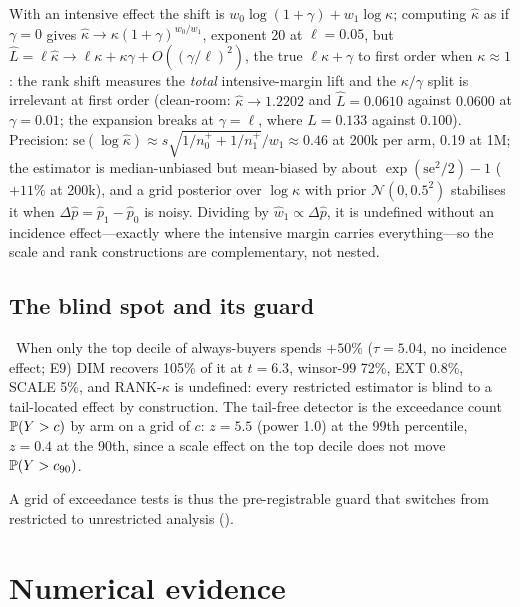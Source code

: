 With an intensive effect the shift is $w_0\log(1 + \gamma) + w_1\log\kappa$; computing $\hat\kappa$ as if $\gamma = 0$ gives $\hat\kappa \to \kappa(1 + \gamma)^{w_0/w_1}$, exponent 20 at $\ell = 0.05$, but $\hat L = \ell\hat\kappa \to \ell\kappa + \kappa\gamma + O((\gamma/\ell)^2)$, the true $\ell\kappa + \gamma$ to first order when $\kappa \approx 1$: the rank shift measures the \emph{total} intensive-margin lift and the $\kappa/\gamma$ split is irrelevant at first order (clean-room: $\hat\kappa \to 1.2202$ and $\hat L = 0.0610$ against $0.0600$ at $\gamma = 0.01$; the expansion breaks at $\gamma = \ell$, where $\hat L = 0.133$ against $0.100$). Precision: $\mathrm{se}(\log\hat\kappa) \approx s\sqrt{1/n_0^+ + 1/n_1^+}/w_1 \approx 0.46$ at 200k per arm, 0.19 at 1M; the estimator is median-unbiased but mean-biased by about $\exp(\mathrm{se}^2/2) - 1$ ($+11\%$ at 200k), and a grid posterior over $\log\kappa$ with prior $\mathcal N(0, 0.5^2)$ stabilises it when $\Delta\hat p = \hat p_1 - \hat p_0$ is noisy. Dividing by $\hat w_1 \propto \Delta\hat p$, it is undefined without an incidence effect---exactly where the intensive margin carries everything---so the scale and rank constructions are complementary, not nested.

\subsection{The blind spot and its guard}

\begin{proposition}
\label{ht:prop:blind}
\tagNumerical\ When only the top decile of always-buyers spends $+50\%$ ($\tau = 5.04$, no incidence effect; E9) DIM recovers 105\% of it at $t = 6.3$, winsor-99 72\%, EXT 0.8\%, SCALE 5\%, and RANK-$\kappa$ is undefined: every restricted estimator is blind to a tail-located effect by construction. The tail-free detector is the exceedance count $\mathbb{P}(Y > c)$ by arm on a grid of $c$: $z = 5.5$ (power 1.0) at the 99th percentile, $z = 0.4$ at the 90th, since a scale effect on the top decile does not move $\mathbb{P}(Y > c_{90})$.
\end{proposition}

A grid of exceedance tests is thus the pre-registrable guard that switches from restricted to unrestricted analysis ().

\section{Numerical evidence}
\label{ht:sec:numerics}

